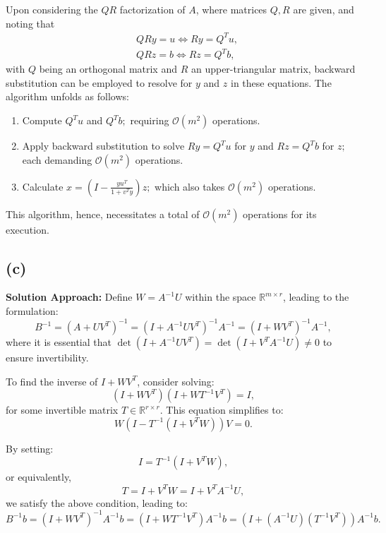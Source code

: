 \documentclass{article}
\begin{document}
Upon considering the \(QR\) factorization of \(A\), where matrices \(Q, R\) are given, and noting that
\[
\begin{aligned}
& QRy = u \Leftrightarrow Ry = Q^Tu, \\
& QRz = b \Leftrightarrow Rz = Q^Tb,
\end{aligned}
\]
with \(Q\) being an orthogonal matrix and \(R\) an upper-triangular matrix, backward substitution can be employed to resolve for \(y\) and \(z\) in these equations. The algorithm unfolds as follows:

\begin{enumerate}
\item Compute \(Q^Tu\) and \(Q^Tb;\) requiring \(\mathcal{O}(m^2)\) operations.
\item Apply backward substitution to solve \(Ry = Q^Tu\) for \(y\) and \(Rz = Q^Tb\) for \(z;\) each demanding \(\mathcal{O}(m^2)\) operations.
\item Calculate \(x = \left(I - \frac{yu^T}{1 + v^Ty}\right)z;\) which also takes \(\mathcal{O}(m^2)\) operations.
\end{enumerate}

This algorithm, hence, necessitates a total of \(\mathcal{O}(m^2)\) operations for its execution.
\subsection{(c)}
\textbf{Solution Approach:} Define \(W = A^{-1} U\) within the space \(\mathbb{R}^{m \times r}\), leading to the formulation:
\[
B^{-1} = \left(A + U V^T\right)^{-1} = \left(I + A^{-1} U V^T\right)^{-1} A^{-1} = \left(I + W V^T\right)^{-1} A^{-1},
\]
where it is essential that \(\det\left(I + A^{-1} U V^T\right) = \det\left(I + V^T A^{-1} U\right) \neq 0\) to ensure invertibility.

To find the inverse of \(I + W V^T\), consider solving:
\[
\left(I + W V^T\right)\left(I + W T^{-1} V^T\right) = I,
\]
for some invertible matrix \(T \in \mathbb{R}^{r \times r}\). This equation simplifies to:
\[
W\left(I - T^{-1}\left(I + V^T W\right)\right) V = 0.
\]

By setting:
\[
I = T^{-1}\left(I + V^T W\right),
\]
or equivalently,
\[
T = I + V^T W = I + V^T A^{-1} U,
\]
we satisfy the above condition, leading to:
\[
B^{-1} b = \left(I + W V^T\right)^{-1} A^{-1} b = \left(I + W T^{-1} V^T\right) A^{-1} b = \left(I + \left(A^{-1} U\right)\left(T^{-1} V^T\right)\right) A^{-1} b.
\]
\end{document}
